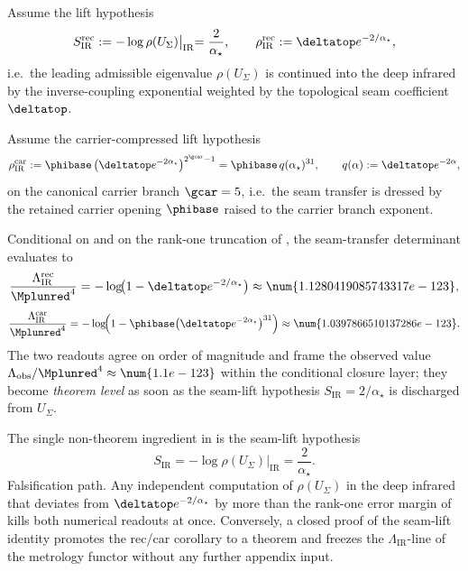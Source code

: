 \begin{conjecture}
\label{conj:ir-seam-rec-continuation}
Assume the lift hypothesis
\[
S_{\mathrm{IR}}^{\mathrm{rec}}
:=
-\log\rho(U_\Sigma)\bigl|_{\mathrm{IR}}
=
\frac{2}{\alpha_\star},
\qquad
\rho_{\mathrm{IR}}^{\mathrm{rec}}
:=
\deltatop e^{-2/\alpha_\star},
\]
i.e.\ the leading admissible eigenvalue $\rho(U_\Sigma)$ is continued into the deep infrared by the
inverse-coupling exponential weighted by the topological seam coefficient $\deltatop$.
\end{conjecture}

\begin{conjecture}
\label{conj:ir-seam-car-continuation}
Assume the carrier-compressed lift hypothesis
\[
\rho_{\mathrm{IR}}^{\mathrm{car}}
:=
\phibase\,\bigl(\deltatop e^{-2\alpha_\star}\bigr)^{2^{\gcar}-1}
=
\phibase\,q(\alpha_\star)^{31},
\qquad
q(\alpha):=\deltatop e^{-2\alpha},
\]
on the canonical carrier branch $\gcar=5$, i.e.\ the seam transfer is dressed by the retained
carrier opening $\phibase$ raised to the carrier branch exponent.
\end{conjecture}

\begin{corollary}
\label{cor:conditional-lambda-ir-readout}
Conditional on  and on the
rank-one truncation of , the seam-transfer determinant evaluates
to
\[
\frac{\Lambda_{\mathrm{IR}}^{\mathrm{rec}}}{\Mplunred^4}
=
-\log\!\bigl(1-\deltatop e^{-2/\alpha_\star}\bigr)
\approx
\num{1.1280419085743317e-123},
\]
\[
\frac{\Lambda_{\mathrm{IR}}^{\mathrm{car}}}{\Mplunred^4}
=
-\log\!\Bigl(1-\phibase\bigl(\deltatop e^{-2\alpha_\star}\bigr)^{31}\Bigr)
\approx
\num{1.0397866510137286e-123}.
\]
The two readouts agree on order of magnitude and frame the observed value
$\Lambda_{\mathrm{obs}}/\Mplunred^4\approx\num{1.1e-123}$ within the conditional closure layer; they
become \emph{theorem level} as soon as the seam-lift hypothesis $S_{\mathrm{IR}}=2/\alpha_\star$ is
discharged from $U_\Sigma$.
\end{corollary}

\begin{remark}
The single non-theorem ingredient in  is the seam-lift
hypothesis
\[
S_{\mathrm{IR}}=-\log\rho(U_\Sigma)\bigl|_{\mathrm{IR}}=\frac{2}{\alpha_\star}.
\]
Falsification path. Any independent computation of $\rho(U_\Sigma)$ in the deep infrared that
deviates from $\deltatop e^{-2/\alpha_\star}$ by more than the rank-one error margin of
 kills both numerical readouts at once. Conversely, a closed
proof of the seam-lift identity promotes the rec/car corollary to a theorem and freezes the
\(\Lambda_{\mathrm{IR}}\)-line of the metrology functor without any further appendix input.
\end{remark}



